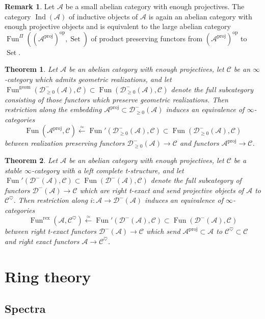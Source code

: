 \documentclass{article}
\newtheorem{theorem}{Theorem}[subsection]
\theoremstyle{definition}
\newtheorem{remark}{Remark}[subsection]
\newcommand{\A}{\mathcal{A}}
\newcommand{\C}{\mathcal{C}}
\newcommand{\D}{\mathcal{D}}
\renewcommand{\i}{\infty}
\newcommand{\from}{\longleftarrow}
\newcommand{\op}{\mathrm{op}}
\DeclareMathOperator{\Fun}{Fun}
\DeclareMathOperator{\proj}{proj}
\DeclareMathOperator{\Set}{Set}
\DeclareMathOperator{\Ind}{Ind}
\begin{document}
\begin{remark}
Let $\A$ be a small abelian category with enough projectives.
The category $\Ind(\A)$ of inductive objects of $\A$ is again an abelian category with enough projective objects and is equivalent to the large abelian category $\Fun^{\Pi}((\A^{\proj})^{\op},\Set)$ of product preserving functors from $(\A^{\proj})^{\op}$ to $\Set$.
\end{remark}

\begin{theorem}{\em \cite[Theorem 1.3.3.8]{HA}}
Let $\A$ be an abelian category with enough projectives, let $\C$ be an $\i$-category which admits geometric realizations, and let $\Fun^\mathrm{geom}(\D^-_{\geq 0}(\A),\C)\subset\Fun(\D^-_{\geq 0}(\A),\C)$ denote the full subcategory consisting of those functors which preserve geometric realizations.
Then restriction along the embedding $\A^{\proj}\subset\D_{\geq 0}^-(\A)$ induces an equivalence of $\i$-categories
\[
\Fun(\A^{\proj},\C)\overset{\simeq}{\from}\Fun'(\D^-_{\geq 0}(\A),\C)\subset\Fun(\D^-_{\geq 0}(\A),\C)
\]
between realization preserving functors $\D^-_{\geq 0}(\A)\to\C$ and functors $\A^{\proj}\to\C$.
\end{theorem}
\begin{theorem}{\em \cite[Theorem HA.1.3.3.2]{HA}}
Let $\A$ be an abelian category with enough projectives, let $\C$ be a stable $\infty$-category with a left complete t-structure, and let $\Fun'(\D^-(\A),\C)\subset\Fun(\D^-(\A),\C)$ denote the full subcategory of functors $\D^-(\A)\to\C$ which are right t-exact and send projective objects of $\A$ to $\C^\heartsuit$.
Then restriction along $i:\A\to\D^-(\A)$ induces an equivalence of $\i$-categories
\[
\Fun^\mathrm{rex}(\A,\C^\heartsuit)\overset{\simeq}{\from}\Fun'(\D^-(\A),\C)\subset\Fun(\D^-(\A),\C)
\]
between right t-exact functors $\D^-(\A)\to\C$ which send $\A^{\proj}\subset\A$ to $\C^\heartsuit\subset\C$ and right exact functors $\A\to\C^\heartsuit$.
\end{theorem}




\section{Ring theory}\label{sec:rt}




\subsection{Spectra}
\end{document}
